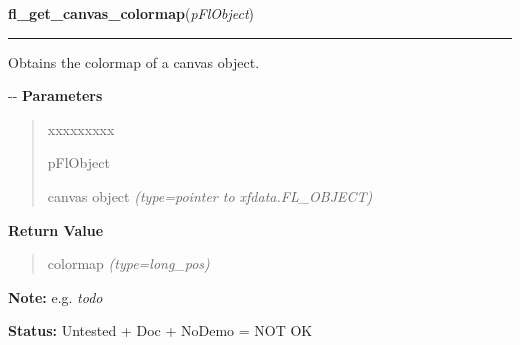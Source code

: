 \hspace{.8\funcindent}\begin{boxedminipage}{\funcwidth}

    \raggedright \textbf{fl\_get\_canvas\_colormap}(\textit{pFlObject})

    \vspace{-1.5ex}

    \rule{\textwidth}{0.5\fboxrule}
\setlength{\parskip}{2ex}

Obtains the colormap of a canvas object.

-{}-
\setlength{\parskip}{1ex}
      \textbf{Parameters}
      \vspace{-1ex}

      \begin{quote}
        \begin{Ventry}{xxxxxxxxx}

          \item[pFlObject]


canvas object
            {\it (type=pointer to xfdata.FL\_OBJECT)}

        \end{Ventry}

      \end{quote}

      \textbf{Return Value}
    \vspace{-1ex}

      \begin{quote}

colormap
      {\it (type=long\_pos)}

      \end{quote}

\textbf{Note:} 
e.g. \emph{todo}


\textbf{Status:} 
Untested + Doc + NoDemo = NOT OK


    \end{boxedminipage}

    \label{xformslib:flcanvas:fl_get_canvas_depth}

    \vspace{0.5ex}

